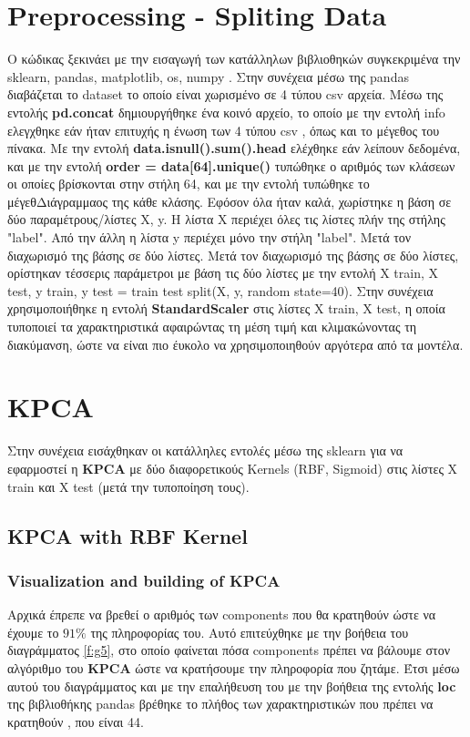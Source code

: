 \section{Preprocessing - Spliting Data}

Ο κώδικας ξεκινάει με την εισαγωγή των κατάλληλων βιβλιοθηκών συγκεκριμένα την
sklearn, pandas, matplotlib, os, numpy . Στην συνέχεια μέσω της pandas διαβάζεται
το dataset το οποίο είναι χωρισμένο σε 4 τύπου csv αρχεία. Μέσω της εντολής \textbf{pd.concat}
δημιουργήθηκε ένα κοινό αρχείο, το οποίο με την εντολή info ελεγχθηκε εάν ήταν
επιτυχής η ένωση των 4 τύπου csv , όπως και το μέγεθος του πίνακα. Με την εντολή
\textbf{data.isnull().sum().head} ελέχθηκε εάν λείπουν δεδομένα, και με την εντολή \textbf{order = data[64].unique()} τυπώθηκε ο αριθμός των κλάσεων οι οποίες βρίσκονται στην στήλη 64, και με την εντολή  τυπώθηκε το μέγεθΔιάγραμμαος της κάθε κλάσης. Εφόσον όλα ήταν καλά, χωρίστηκε η βάση σε δύο παραμέτρους/λίστες X, y. Η λίστα X περιέχει όλες τις λίστες πλήν της στήλης
"label". Από την άλλη η λίστα y περιέχει μόνο την στήλη "label". Μετά τον διαχωρισμό
της βάσης σε δύο λίστες. Μετά τον διαχωρισμό της βάσης σε δύο λίστες, ορίστηκαν
τέσσερις παράμετροι με βάση τις δύο λίστες με την εντολή X train, X test, y train, y
test = train test split(X, y, random state=40).
Στην συνέχεια χρησιμοποιήθηκε η εντολή \textbf{StandardScaler} στις λίστες Χ train, X test, η οποία τυποποιεί  τα χαρακτηριστικά αφαιρώντας τη μέση τιμή και κλιμακώνοντας τη διακύμανση, ώστε να είναι πιο έυκολο να χρησιμοποιηθούν αργότερα από τα μοντέλα.

\section{KPCA}

Στην συνέχεια εισάχθηκαν οι κατάλληλες εντολές μέσω της sklearn για να εφαρμοστεί η \textbf{KPCA} με δύο διαφορετικούς Κernels (RBF, Sigmoid) στις λίστες Χ train και Χ test (μετά την τυποποίηση τους).

\subsection{KPCA with RBF Kernel}

\subsubsection{Visualization and building of KPCA}
Αρχικά έπρεπε να βρεθεί ο αριθμός των components που θα κρατηθούν ώστε να έχουμε το $91\%$ της πληροφορίας του. Αυτό επιτεύχθηκε με την βοήθεια του διαγράμματος \ref{f:g5}, στο οποίο φαίνεται πόσα components πρέπει να βάλουμε στον αλγόριθμο του \textbf{KPCA} ώστε να κρατήσουμε την πληροφορία που ζητάμε. Έτσι μέσω αυτού του διαγράμματος και με την επαλήθευση του με την βοήθεια της εντολής \textbf{loc} της βιβλιοθήκης pandas βρέθηκε το πλήθος των χαρακτηριστικών που πρέπει να κρατηθούν , που είναι 44.

